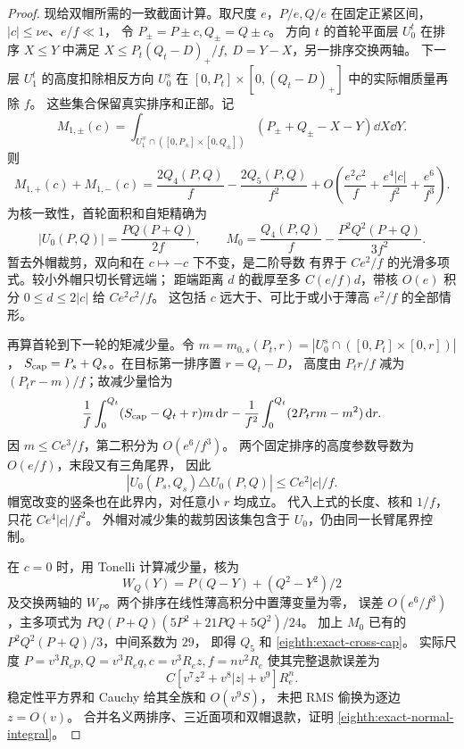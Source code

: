 \begin{proof}
现给双帽所需的一致截面计算。取尺度 \(e\)，\(P/e,Q/e\)
在固定正紧区间，\(|c|\le\nu e\)、\(e/f\ll1\)，
令 \(P_\pm=P\pm c,Q_\pm=Q\pm c\)。
方向 \(t\) 的首轮平面层 \(U_0^t\) 在排序 \(X\le Y\) 中满足
\(X\le P_t(Q_t-D)_+/f,\ D=Y-X\)，另一排序交换两轴。
下一层 \(U_1^t\) 的高度扣除相反方向 \(U_0^s\)
在 \([0,P_t]\times[0,(Q_t-D)_+]\) 中的实际帽质量再除 \(f\)。
这些集合保留真实排序和正部。记
\[
 M_{1,\pm}(c)=
 \int_{U_1^\mp\cap([0,P_\pm]\times[0,Q_\pm])}
           (P_\pm+Q_\pm-X-Y)\dd X\dd Y .
\]
则
\begin{equation}\label{eighth:exact-cross-cap}
 M_{1,+}(c)+M_{1,-}(c)
 =\frac{2Q_4(P,Q)}f-\frac{2Q_5(P,Q)}{f^2}
 +O\!\left(\frac{e^2c^2}{f}+\frac{e^4|c|}{f^2}
                         +\frac{e^6}{f^3}\right).
\end{equation}
为核一致性，首轮面积和自矩精确为
\[
 |U_0(P,Q)|=\frac{PQ(P+Q)}{2f},\qquad
 M_0=\frac{Q_4(P,Q)}f-\frac{P^2Q^2(P+Q)}{3f^2}.
\]
暂去外帽裁剪，双向和在 \(c\mapsto-c\) 下不变，是二阶导数
有界于 \(Ce^2/f\) 的光滑多项式。较小外帽只切长臂远端；
距端距离 \(d\) 的截厚至多 \(C(e/f)d\)，带核 \(O(e)\)
积分 \(0\le d\le2|c|\) 给 \(Ce^2c^2/f\)。
这包括 \(c\) 远大于、可比于或小于薄高 \(e^2/f\) 的全部情形。

再算首轮到下一轮的矩减少量。令
\(m=m_{0,s}(P_t,r)=|U_0^s\cap([0,P_t]\times[0,r])|\)，
\(S_{\rm cap}=P_s+Q_s\)。在目标第一排序置 \(r=Q_t-D\)，
高度由 \(P_tr/f\) 减为 \((P_tr-m)/f\)；故减少量恰为
\[
 \frac1f\int_0^{Q_t}(S_{\rm cap}-Q_t+r)m\,\mathrm d r
 -\frac1{f^2}\int_0^{Q_t}(2P_trm-m^2)\,\mathrm d r.
\]
因 \(m\le Ce^3/f\)，第二积分为 \(O(e^6/f^3)\)。
两个固定排序的高度参数导数为 \(O(e/f)\)，末段又有三角尾界，
因此
\[
 |U_0(P_s,Q_s)\triangle U_0(P,Q)|\le Ce^2|c|/f.
\]
帽宽改变的竖条也在此界内，对任意小 \(r\) 均成立。
代入上式的长度、核和 \(1/f\)，只花 \(Ce^4|c|/f^2\)。
外帽对减少集的裁剪因该集包含于 \(U_0\)，仍由同一长臂尾界控制。

在 \(c=0\) 时，用 Tonelli 计算减少量，核为
\[
 W_Q(Y)=P(Q-Y)+(Q^2-Y^2)/2
\]
及交换两轴的 \(W_P\)。两个排序在线性薄高积分中置薄变量为零，
误差 \(O(e^6/f^3)\)，主多项式为
\(PQ(P+Q)(5P^2+21PQ+5Q^2)/24\)。
加上 \(M_0\) 已有的 \(P^2Q^2(P+Q)/3\)，中间系数为 \(29\)，
即得 \(Q_5\) 和 \eqref{eighth:exact-cross-cap}。
实际尺度 \(P=v^3R_ep,Q=v^3R_eq,c=v^3R_ez,f=nv^2R_e\)
使其完整退款误差为
\[
 C[v^7z^2+v^8|z|+v^9]R_e^n.
\]
稳定性平方界和 Cauchy 给其全族和 \(O(v^9S)\)，
未把 RMS 偷换为逐边 \(z=O(v)\)。
合并名义两排序、三近面项和双帽退款，证明
\eqref{eighth:exact-normal-integral}。


\end{proof}
